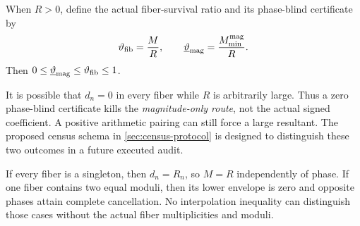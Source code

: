 \begin{definition}
\label{def:survival}
When \(R>0\), define the actual fiber-survival ratio and its
phase-blind certificate by
\begin{equation}
 \vartheta_{\rm fib}=\frac{M}{R},\qquad
 \underline\vartheta_{\rm mag}
 =\frac{M_{\min}^{\rm mag}}{R}.
\label{eq:survival-ratios}
\end{equation}
Then \(0\le\underline\vartheta_{\rm mag}
\le\vartheta_{\rm fib}\le1\).
\end{definition}

\begin{remark}
\label{rem:zero-envelope}
It is possible that \(d_n=0\) in every fiber while \(R\) is arbitrarily
large.  Thus a zero phase-blind certificate kills the
\emph{magnitude-only route}, not the actual signed coefficient.  A
positive arithmetic pairing can still force a large resultant.  The
proposed census schema in \cref{sec:census-protocol} is designed to
distinguish these two outcomes in a future executed audit.
\end{remark}

\begin{example}
If every fiber is a singleton, then \(d_n=R_n\), so \(M=R\)
independently of phase.  If one fiber contains two equal moduli, then
its lower envelope is zero and opposite phases attain complete
cancellation.  No interpolation inequality can distinguish those
cases without the actual fiber multiplicities and moduli.
\end{example}
